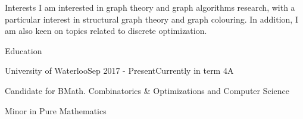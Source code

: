\documentclass{cv}
\begin{document}
\begin{rSection}{Interests}
	I am interested in graph theory and graph algorithms research, with a particular interest in structural graph theory and graph colouring. In addition, I am also keen on topics related to discrete optimization.
\end{rSection}

\begin{rSection}{Education}

\begin{rSubsection}{University of Waterloo}{Sep 2017 - Present}{Currently in term 4A}{}
	\item Candidate for BMath. Combinatorics \& Optimizations and Computer Science
	\item Minor in Pure Mathematics
\end{rSubsection}



\end{rSection}
\end{document}
